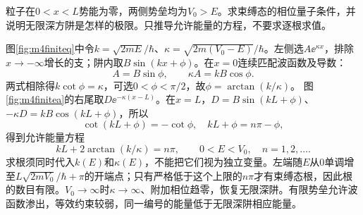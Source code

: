 \begin{example}\label{ex:m4finitebarrier}
粒子在$0<x<L$势能为零，两侧势垒均为$V_0>E$。求束缚态的相位量子条件，并说明无限深方阱是怎样的极限。只推导允许能量的方程，不要求逐根求值。
\end{example}
\begin{solution}
图\ref{fig:m4finiteq}中令$k=\sqrt{2mE}/\hbar$、$\kappa=\sqrt{2m(V_0-E)}/\hbar$。左侧选$A\ee^{\kappa x}$，排除$x\to-\infty$增长的支；阱内取$B\sin(kx+\phi)$。在$x=0$连续匹配波函数及导数：
\[
 A=B\sin\phi,\qquad \kappa A=kB\cos\phi.
\]
两式相除得$k\cot\phi=\kappa$，可选$0<\phi<\pi/2$，故$\phi=\arctan(k/\kappa)$。
图\ref{fig:m4finitea}的右尾取$D\ee^{-\kappa(x-L)}$。在$x=L$，$D=B\sin(kL+\phi)$、$-\kappa D=kB\cos(kL+\phi)$，所以
\[
 \cot(kL+\phi)=-\cot\phi,
 \quad kL+\phi=n\pi-\phi,
\]
得到允许能量方程
\[
 kL+2\arctan(k/\kappa)=n\pi,
 \qquad 0<E<V_0,\quad n=1,2,\ldots.
\]
求根须同时代入$k(E)$和$\kappa(E)$，不能把它们视为独立变量。左端随$E$从0单调增至$L\sqrt{2mV_0}/\hbar+\pi$的开端点；只有严格低于这个上限的$n\pi$才有束缚态根，因此根的数目有限。$V_0\to\infty$时$\kappa\to\infty$、附加相位趋零，恢复无限深阱。有限势垒允许波函数渗出，等效约束较弱，同一编号的能量低于无限深阱相应能量。
\end{solution}

